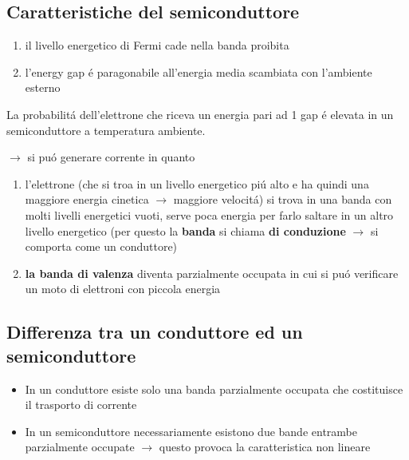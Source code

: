 \documentclass{article}
\begin{document}
\subsection{Caratteristiche del semiconduttore}
\begin{enumerate}
    \item il livello energetico di Fermi cade nella banda proibita
    \item l'energy gap \'e paragonabile all'energia media scambiata con l'ambiente esterno
\end{enumerate}

La probabilit\'a dell'elettrone che riceva un energia pari ad 1 gap \'e elevata in un semiconduttore a temperatura ambiente.

$\rightarrow$ si pu\'o generare corrente in quanto
\begin{enumerate}
    \item l'elettrone (che si troa in un livello energetico pi\'u alto e ha quindi una maggiore energia cinetica $\rightarrow$ maggiore velocit\'a) si trova in una banda con molti livelli energetici vuoti, serve poca energia per farlo saltare in un altro livello energetico (per questo la \textbf{banda} si chiama \textbf{di conduzione} $\rightarrow$ si comporta come un conduttore)
    \item \textbf{la banda di valenza} diventa parzialmente occupata in cui si pu\'o verificare un moto di elettroni con piccola energia
\end{enumerate}

\subsection{Differenza tra un conduttore ed un semiconduttore}
\begin{itemize}
    \item In un conduttore esiste solo una banda parzialmente occupata che costituisce il trasporto di corrente
    \item In un semiconduttore necessariamente esistono due bande entrambe parzialmente occupate $\rightarrow$ questo provoca la caratteristica non lineare
\end{itemize}
\end{document}
